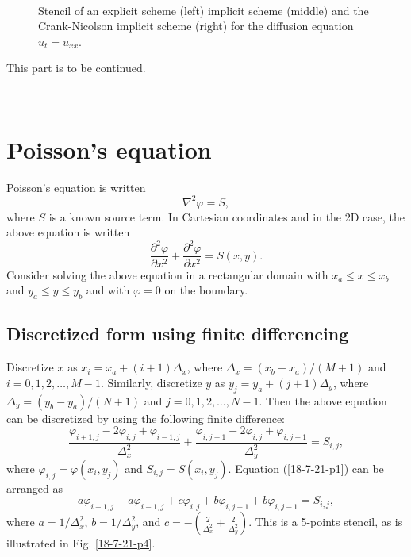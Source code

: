 \documentclass{article}
\begin{document}
\

\begin{figure}[h]
  \caption{\label{18-4-15-8}Stencil of an explicit scheme (left) implicit
  scheme (middle) and the Crank-Nicolson implicit scheme (right) for the
  diffusion equation $u_t = u_{x x}$.}
\end{figure}

This part is to be continued.

\

\section{Poisson's equation}

Poisson's equation is written
\begin{equation}
  \nabla^2 \varphi = S,
\end{equation}
where $S$ is a known source term. In Cartesian coordinates and in the 2D case,
the above equation is written
\begin{equation}
  \frac{\partial^2 \varphi}{\partial x^2} + \frac{\partial^2 \varphi}{\partial
  x^2} = S (x, y) .
\end{equation}
Consider solving the above equation in a rectangular domain with $x_a
\leqslant x \leqslant x_b$ and $y_a \leqslant y \leqslant y_b$ and with
$\varphi = 0$ on the boundary.

\subsection{Discretized form using finite differencing}

Discretize $x$ as $x_i = x_a + (i + 1) \Delta_x$, where $\Delta_x = (x_b -
x_a) / (M + 1)$ and $i = 0, 1, 2, \ldots, M - 1$. Similarly, discretize $y$ as
$y_j = y_a + (j + 1) \Delta_y$, where $\Delta_y = (y_b - y_a) / (N + 1)$ and
$j = 0, 1, 2, \ldots, N - 1$. Then the above equation can be discretized by
using the following finite difference:
\begin{equation}
  \label{18-7-21-p1} \frac{\varphi_{i + 1, j} - 2 \varphi_{i, j} + \varphi_{i
  - 1, j}}{\Delta^2_x} + \frac{\varphi_{i, j + 1} - 2 \varphi_{i, j} +
  \varphi_{i, j - 1}}{\Delta^2_y} = S_{i, j},
\end{equation}
where $\varphi_{i, j} = \varphi (x_i, y_j)$ and $S_{i, j} = S (x_i, y_j)$.
Equation (\ref{18-7-21-p1}) can be arranged as
\begin{equation}
  \label{18-7-21-p2} a \varphi_{i + 1, j} + a \varphi_{i - 1, j} + c
  \varphi_{i, j} + b \varphi_{i, j + 1} + b \varphi_{i, j - 1} = S_{i, j},
\end{equation}
where $a = 1 / \Delta_x^2$, $b = 1 / \Delta_y^2$, and $c = - \left(
\frac{2}{\Delta_x^2} + \frac{2}{\Delta_y^2} \right)$. This is a 5-points
stencil, as is illustrated in Fig. \ref{18-7-21-p4}.
\end{document}
